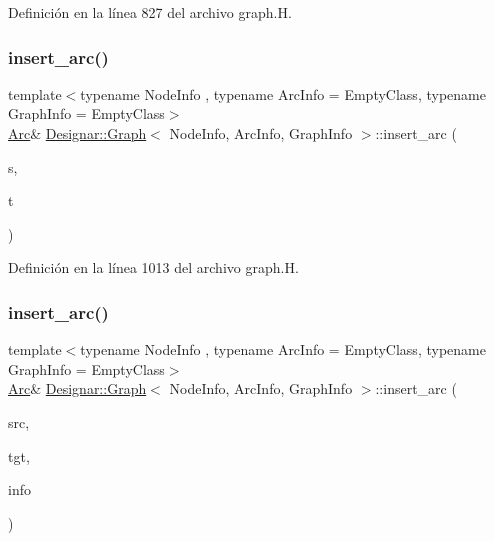 Definición en la línea 827 del archivo graph.\+H.

\mbox{\label{class_designar_1_1_graph_a794e687e21db6f4e00e14c6bdc5c2907}} 
\subsubsection{\texorpdfstring{insert\+\_\+arc()}{insert\_arc()}\hspace{0.1cm}{\footnotesize\ttfamily [2/4]}}
{\footnotesize\ttfamily template$<$typename Node\+Info , typename Arc\+Info  = Empty\+Class, typename Graph\+Info  = Empty\+Class$>$ \\
\hyperlink{class_designar_1_1_graph_a74c730ef4ce2d20f998d72bd25c2b5bf}{Arc}\& \hyperlink{class_designar_1_1_graph}{Designar\+::\+Graph}$<$ Node\+Info, Arc\+Info, Graph\+Info $>$\+::insert\+\_\+arc (\begin{DoxyParamCaption}\item[{\hyperlink{class_designar_1_1_graph_a5dfc7dba9d092ac489c72e40390c37d0}{Node} \&}]{s,  }\item[{\hyperlink{class_designar_1_1_graph_a5dfc7dba9d092ac489c72e40390c37d0}{Node} \&}]{t }\end{DoxyParamCaption})\hspace{0.3cm}{\ttfamily [inline]}}



Definición en la línea 1013 del archivo graph.\+H.

\mbox{\label{class_designar_1_1_graph_ad310a106f10d0a7ff12915d8b47e8e3d}} 
\subsubsection{\texorpdfstring{insert\+\_\+arc()}{insert\_arc()}\hspace{0.1cm}{\footnotesize\ttfamily [3/4]}}
{\footnotesize\ttfamily template$<$typename Node\+Info , typename Arc\+Info  = Empty\+Class, typename Graph\+Info  = Empty\+Class$>$ \\
\hyperlink{class_designar_1_1_graph_a74c730ef4ce2d20f998d72bd25c2b5bf}{Arc}\& \hyperlink{class_designar_1_1_graph}{Designar\+::\+Graph}$<$ Node\+Info, Arc\+Info, Graph\+Info $>$\+::insert\+\_\+arc (\begin{DoxyParamCaption}\item[{\hyperlink{class_designar_1_1_graph_a5dfc7dba9d092ac489c72e40390c37d0}{Node} \&}]{src,  }\item[{\hyperlink{class_designar_1_1_graph_a5dfc7dba9d092ac489c72e40390c37d0}{Node} \&}]{tgt,  }\item[{const Arc\+Info \&}]{info }\end{DoxyParamCaption})\hspace{0.3cm}{\ttfamily [inline]}}



